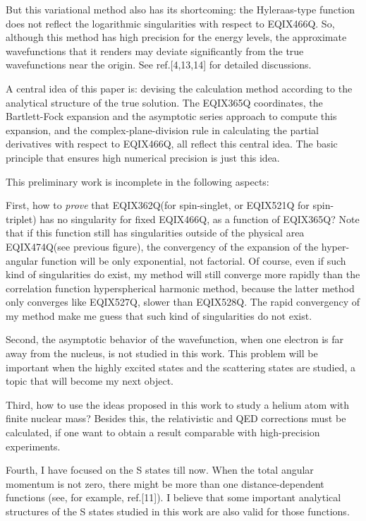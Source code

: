 But this variational method also has its shortcoming: the Hyleraas-type
function does not reflect the logarithmic singularities with respect to
EQIX466Q. So, although this method has high precision for the energy levels,
the approximate wavefunctions that it renders may deviate significantly
from the true wavefunctions near the origin. See ref.[4,13,14] for detailed
discussions.

A central idea of this paper is: devising the calculation method
according to the analytical structure of the true solution. The EQIX365Q
coordinates, the Bartlett-Fock expansion and the asymptotic series approach
to compute this expansion, and the complex-plane-division rule in calculating
the partial derivatives with respect to EQIX466Q, all reflect this central
idea. The basic principle that ensures high numerical precision is just
this idea.

This preliminary work is incomplete in the following aspects:

First, how to \emph{prove} that EQIX362Q(for spin-singlet, or 
EQIX521Q for spin-triplet) has no singularity for fixed EQIX466Q,
as a function of EQIX365Q? Note that if this function still has singularities outside
of the physical area EQIX474Q(see previous figure), the convergency of
the expansion of the hyper-angular function
will be only exponential, not factorial. Of course, even if
such kind of singularities do exist, my method will still converge more rapidly
than the correlation function hyperspherical harmonic method, because the latter
method only converges like EQIX527Q, slower than EQIX528Q.
The rapid convergency of my method make me guess that such kind of singularities
do not exist.

Second, the asymptotic behavior of the wavefunction, when one electron is
far away from the nucleus, is not studied in this work. This problem
will be important when the highly excited states and the scattering states are
studied, a topic that will become my next object. 

Third, how to use the ideas proposed in this work to study a helium atom
with finite nuclear mass? Besides this, the relativistic and QED corrections
must be calculated, if one want to obtain a result comparable with
high-precision experiments.

Fourth, I have focused on the S states till now. When the total angular momentum
is not zero, there might be more than one distance-dependent functions (see, for
example, ref.[11]). I believe that some important analytical structures of the
S states studied in this work are also valid for those functions.


